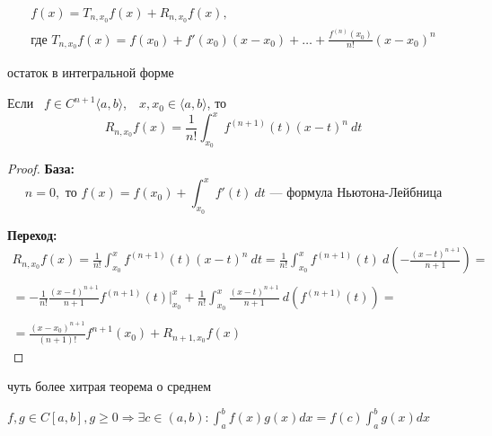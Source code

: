 \quad
\[
    \begin{gathered}
        f(x) = T_{n, x_0} f(x) + R_{n, x_0} f(x),\\
        \text{где } T_{n, x_0} f(x) = f(x_0) + f'(x_0)(x - x_0) + \dots + \frac{f^{(n)}(x_0)}{n!}(x - x_0)^n
    \end{gathered}
\]

\begin{namedtheorem}{остаток в интегральной форме}
    
    Если \, $f \in C^{n + 1} \langle a, b \rangle$,  \,\, $x, x_0 \in \langle a, b \rangle$, то
    \[
        R_{n, x_0}f(x) = \frac{1}{n!} \int_{x_0}^x f^{(n + 1)}(t)(x-t)^n\ dt
    \]
\end{namedtheorem}

\begin{proof}

    \textbf{\large База:} 
    \[
        n = 0, \text{ то } f(x) = f(x_0) + \int_{x_0}^{x}f'(t)\ dt  \text{ --- формула Ньютона-Лейбница}
    \]

    \textbf{\large Переход:} 
    \[
        \begin{gathered}
        R_{n, x_0}f(x) = \frac{1}{n!} \int_{x_0}^{x}f^{(n+1)}(t)(x - t)^n\ dt =
        \frac{1}{n!} \int_{x_0}^x f^{(n + 1)}(t)\ d\left(-\frac{(x - t) ^ {n + 1}}{n + 1}\right) =\\\\
        = - \frac{1}{n!} \frac{(x - t) ^ {n + 1}}{n + 1} f^{(n + 1)}(t) \bigg|_{x_0}^{x} +
        \frac{1}{n!} \int_{x_0}^{x} \frac{(x - t)^{n + 1}}{n + 1}\ d\left(f^{(n + 1)}(t)\right) =\\\\
        = \frac{(x - x_0) ^ {n + 1}}{(n + 1)!} f^{n + 1}(x_0) + R_{n + 1, x_0} f(x)
        \end{gathered}
    \]


\end{proof}


\begin{namedlemma}{чуть более хитрая теорема о среднем}
    
    $f, g \in C[a, b], g \geqslant 0 \Rightarrow \exists c \in (a, b) : \int_a^b f(x) g(x) dx = f(c) \int_a^b g(x) dx$
\end{namedlemma}

